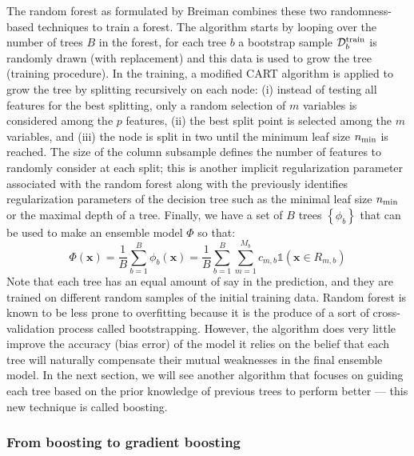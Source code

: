 \documentclass[main]{subfiles}
\begin{document}
The random forest as formulated by Breiman combines these two randomness-based techniques to train a forest.\autocite{Breiman_2001} The algorithm starts by looping over the number of trees $B$ in the forest, for each tree $b$ a bootstrap sample $\mathcal{D}^{\text{train}}_b$ is randomly drawn (with replacement) and this data is used to grow the tree (training procedure). In the training, a modified CART algorithm is applied to grow the tree by splitting recursively on each node: (i) instead of testing all features for the best splitting, only a random selection of $m$ variables is considered among the $p$ features, (ii) the best split point is selected among the $m$ variables, and (iii) the node is split in two until the minimum leaf size $n_{\text{min}}$ is reached. The size of the column subsample defines the number of features to randomly consider at each split; this is another implicit regularization parameter associated with the random forest along with the previously identifies regularization parameters of the decision tree such as the minimal leaf size $n_{\text{min}}$ or the maximal depth of a tree. Finally, we have a set of $B$ trees $\left\{\phi_b\right\}$ that can be used to make an ensemble model $\Phi$ so that:
\begin{equation}
  \Phi(\mathbf{x}) = \frac{1}{B}\sum_{b=1}^{B} \phi_b(\mathbf{x}) = \frac{1}{B}\sum_{b=1}^{B}\sum_{m=1}^{M_b} c_{m,b} \mathbb{1}(\mathbf{x}\in R_{m,b})
\end{equation}
Note that each tree has an equal amount of say in the prediction, and they are trained on different random samples of the initial training data. Random forest is known to be less prone to overfitting because it is the produce of a sort of cross-validation process called bootstrapping. However, the algorithm does very little improve the accuracy (bias error) of the model it relies on the belief that each tree will naturally compensate their mutual weaknesses in the final ensemble model. In the next section, we will see another algorithm that focuses on guiding each tree based on the prior knowledge of previous trees to perform better --- this new technique is called boosting.

\subsubsection{From boosting to gradient boosting}\label{sct:boosting}
\end{document}
